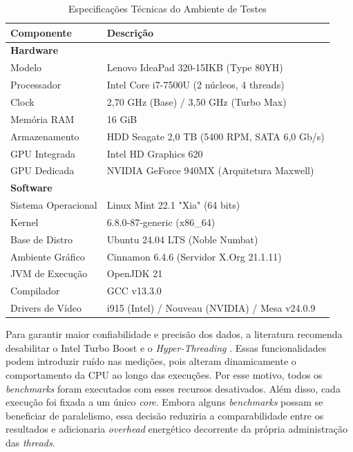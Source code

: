 \begin{table}[ht]
    \centering
    \caption{Especificações Técnicas do Ambiente de Testes}
    \label{tab:especificacoes_sistema}
    \begin{tabularx}{\textwidth}{l X}
        \toprule
        \textbf{Componente} & \textbf{Descrição} \\
        \midrule
        \textbf{Hardware} & \\
        Modelo & Lenovo IdeaPad 320-15IKB (Type 80YH) \\
        Processador & Intel Core i7-7500U (2 núcleos, 4 threads) \\
        Clock & 2,70 GHz (Base) / 3,50 GHz (Turbo Max) \\
        Memória RAM & 16 GiB \\
        Armazenamento & HDD Seagate 2,0 TB (5400 RPM, SATA 6,0 Gb/s) \\
        GPU Integrada & Intel HD Graphics 620 \\
        GPU Dedicada & NVIDIA GeForce 940MX (Arquitetura Maxwell) \\
        \midrule
        \textbf{Software} & \\
        Sistema Operacional & Linux Mint 22.1 "Xia" (64 bits) \\
        Kernel & 6.8.0-87-generic (x86\_64) \\
        Base de Distro & Ubuntu 24.04 LTS (Noble Numbat) \\
        Ambiente Gráfico & Cinnamon 6.4.6 (Servidor X.Org 21.1.11) \\
        JVM de Execução & OpenJDK 21 \\
        Compilador & GCC v13.3.0 \\
        Drivers de Vídeo & i915 (Intel) / Nouveau (NVIDIA) / Mesa v24.0.9 \\
        \bottomrule
    \end{tabularx}
    \vspace{2pt}
    \small
    \centering
\end{table}

Para garantir maior confiabilidade e precisão dos dados, a literatura recomenda
desabilitar o Intel Turbo Boost e o \textit{Hyper-Threading}
\cite{vms-hot-and-cold, steady-state-assessment}. Essas funcionalidades podem
introduzir ruído nas medições, pois alteram dinamicamente o comportamento da
CPU ao longo das execuções. Por esse motivo, todos os \textit{benchmarks}
foram executados com esses recursos desativados. Além disso, cada execução foi
fixada a um único \textit{core}. Embora alguns \textit{benchmarks} possam se
beneficiar de paralelismo, essa decisão reduziria a comparabilidade entre os
resultados e adicionaria \textit{overhead} energético decorrente da própria
administração das \textit{threads}.


